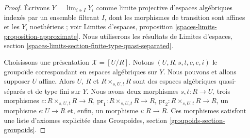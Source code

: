 \begin{proof}
Écrivons $Y = \lim_{i \in I} Y_i$ comme limite projective d'espaces algébriques
indexés par un ensemble filtrant $I$, dont les morphismes de transition sont
affines et les $Y_i$ noethériens ; voir Limites d'espaces, proposition
\ref{spaces-limits-proposition-approximate}. Nous utiliserons les résultats de
Limites d'espaces, section
\ref{spaces-limits-section-finite-type-quasi-separated}.

\medskip\noindent
Choisissons une présentation $\mathcal{X} = [U/R]$. Notons
$(U, R, s, t, c, e, i)$ le groupoïde correspondant en espaces algébriques sur
$Y$. Nous pouvons et allons supposer $U$ affine. Alors $U$, $R$ et
$R \times_{s, U, t} R$ sont des espaces algébriques quasi-séparés et de type
fini sur $Y$. Nous avons deux morphismes $s, t : R \to U$, trois morphismes
$c : R \times_{s, U, t} R \to R$,
$\text{pr}_1 : R \times_{s, U, t} R \to R$,
$\text{pr}_2 : R \times_{s, U, t} R \to R$,
un morphisme $e : U \to R$ et, enfin, un morphisme $i : R \to R$. Ces
morphismes satisfont une liste d'axiomes explicitée dans Groupoïdes, section
\ref{groupoids-section-groupoids}.


\end{proof}
